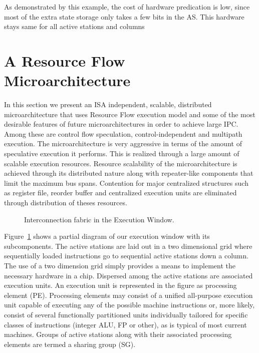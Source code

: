\documentclass[10pt,twocolumn]{IEEEtran}
\begin{document}
As demonstrated by this example, the cost of hardware predication is
low, since most of the extra state storage only takes a few bits in the
AS.  This hardware stays same for all active stations and columns

\section {A Resource Flow Microarchitecture}

In this section we present an ISA independent, scalable, distributed
microarchitecture that uses Resource Flow execution model and some of
the most desirable features of future microarchitectures in order to
achieve large IPC.  Among these are control flow speculation,
control-independent and multipath execution.  The microarchitecture is
very aggressive in terms of the amount of speculative execution it
performs.  This is realized through a large amount of scalable
execution resources.  Resource scalability of the microarchitecture is
achieved through its distributed nature along with repeater-like
components that limit the maximum bus spans.  Contention for major
centralized structures such as register file, reorder buffer and
centralized execution units are eliminated through distribution of
theses resources.

\begin{figure}
{}
\caption{Interconnection fabric in the Execution Window.}
\label{fig:execwind}
\end{figure}  

Figure~\ref{fig:execwind} shows a partial diagram of our execution
window with its subcomponents.  The active stations are laid out in a
two dimensional grid where sequentially loaded instructions go to
sequential active stations down a column.  The use of a two dimension
grid simply provides a means to implement the necessary hardware in a
chip.
%
%
Dispersed among the active stations are associated execution units.  An
execution unit is represented in the figure as processing element
(PE).  Processing elements may consist of a unified all-purpose
execution unit capable of executing any of the possible machine
instructions or, more likely, consist of several functionally
partitioned units individually tailored for specific classes of
instructions (integer ALU, FP or other), as is typical of most current
machines.  Groups of active stations along with their associated
processing elements are termed a sharing group (SG).
\end{document}
